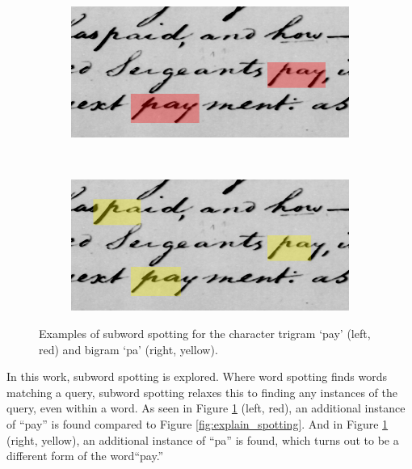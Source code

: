 \documentclass[ms,electronic,twosidetoc,letterpaper,chaptercenter,parttop,lof,lot]{byumsphd}
\begin{document}
\begin{figure}[t]
    \begin{subfigure}{0.46\textwidth}
    		\centering
    		\includegraphics[width=\textwidth]{spotting_explination_sub_pay}
    	\end{subfigure}
    	~
    	\begin{subfigure}{0.46\textwidth}
    		\centering
    		\includegraphics[width=\textwidth]{spotting_explination_sub_pa}
    	\end{subfigure}
    	\caption{Examples of subword spotting for the character trigram `pay' (left, red) and bigram `pa' (right, yellow).}
    	\label{fig:explain_sub_spotting}
\end{figure}

In this work, subword spotting is explored. Where word spotting finds words matching a query, subword spotting relaxes this to finding any instances of the query, even within a word. As seen in Figure \ref{fig:explain_sub_spotting} (left, red), an additional instance of ``pay'' is found compared to Figure \ref{fig:explain_spotting}.
And in Figure \ref{fig:explain_sub_spotting} (right, yellow), an additional instance of ``pa'' is found, which turns out to be a different form of the word``pay.''
\end{document}
